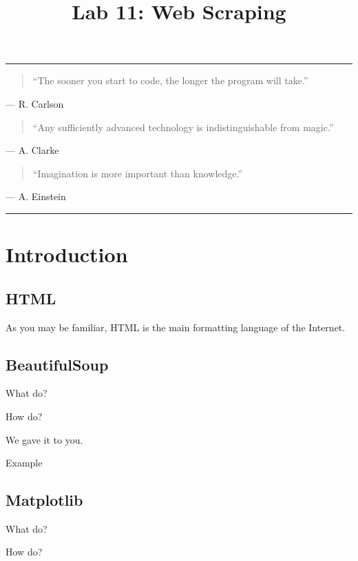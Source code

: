 \documentclass[11pt]{cselabheader}
\title{Lab 11: Web Scraping}
\begin{document}
\maketitle

\hrule
\begin{quotation}
``The sooner you start to code, the longer the program will take.''
\end{quotation}
\begin{flushright}
--- R. Carlson
\end{flushright}

\begin{quotation}
``Any sufficiently advanced technology is indistinguishable from magic.''
\end{quotation}
\begin{flushright}
--- A. Clarke
\end{flushright}

\begin{quotation}
``Imagination is more important than knowledge.''
\end{quotation}
\begin{flushright}
--- A. Einstein
\end{flushright}

\hrule

\section{Introduction}

\subsection{HTML}

As you may be familiar, HTML is the main formatting language of the
Internet.

\subsection{BeautifulSoup}

What do?

How do?

We gave it to you.

Example

\subsection{Matplotlib}

What do?

How do?
\end{document}
